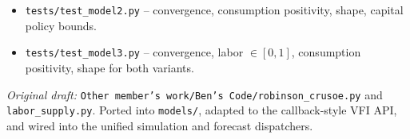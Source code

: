 \documentclass[11pt]{article}
\begin{document}
\begin{intuitbox}
\begin{itemize}
\begin{itemize}
        \item \texttt{labor\_vs\_wage\_for\_plot} (line~222): helper for the static intuition graph in \texttt{app.py}.
    \end{itemize}
    \item \texttt{tests/test\_model2.py} -- convergence, consumption positivity, shape, capital policy bounds.
    \item \texttt{tests/test\_model3.py} -- convergence, labor $\in [0,1]$, consumption positivity, shape for both variants.
\end{itemize}
\textit{Original draft:} \texttt{Other member's work/Ben's Code/robinson\_crusoe.py} and \texttt{labor\_supply.py}. Ported into \texttt{models/}, adapted to the callback-style VFI API, and wired into the unified simulation and forecast dispatchers.


\end{intuitbox}
\end{document}
